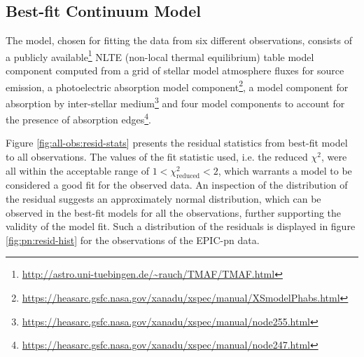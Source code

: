     	\subsection{Best-fit Continuum Model} \label{multi-obs:discussion:cont-mod}
    		The model, chosen for fitting the data from six different observations, consists of a publicly available\footnote{\url{http://astro.uni-tuebingen.de/~rauch/TMAF/TMAF.html}} NLTE (non-local thermal equilibrium) table model component computed from a grid of stellar model atmosphere fluxes for source emission, a photoelectric absorption model component\footnote{\url{https://heasarc.gsfc.nasa.gov/xanadu/xspec/manual/XSmodelPhabs.html}}, a model component for absorption by inter-stellar medium\footnote{\url{https://heasarc.gsfc.nasa.gov/xanadu/xspec/manual/node255.html}} and four model components to account for the presence of absorption edges\footnote{\url{https://heasarc.gsfc.nasa.gov/xanadu/xspec/manual/node247.html}}.
    		
    		Figure \ref{fig:all-obs:resid-stats} presents the residual statistics from best-fit model to all observations. The values of the fit statistic used, i.e. the reduced $\chi^2$, were all within the acceptable range of $1<\chi^2_\text{reduced}<2$, which warrants a model to be considered a good fit for the observed data. An inspection of the distribution of the residual suggests an approximately normal distribution, which can be observed in the best-fit models for all the observations, further supporting the validity of the model fit. Such a distribution of the residuals is displayed in figure \ref{fig:pn:resid-hist} for the observations of the EPIC-pn data.
    		
